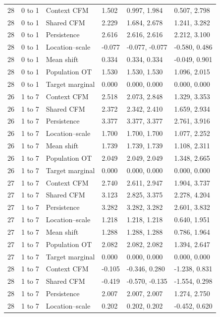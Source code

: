 {\begin{longtable}{@{}p{14mm}p{18mm}p{36mm}p{24mm}p{32mm}p{39mm}@{}}
28 & 0 to 1 & Context CFM & 1.502 & 0.997, 1.984 & 0.507, 2.798\\
28 & 0 to 1 & Shared CFM & 2.229 & 1.684, 2.678 & 1.241, 3.282\\
28 & 0 to 1 & Persistence & 2.616 & 2.616, 2.616 & 2.212, 3.100\\
28 & 0 to 1 & Location--scale & -0.077 & -0.077, -0.077 & -0.580, 0.486\\
28 & 0 to 1 & Mean shift & 0.334 & 0.334, 0.334 & -0.049, 0.901\\
28 & 0 to 1 & Population OT & 1.530 & 1.530, 1.530 & 1.096, 2.015\\
28 & 0 to 1 & Target marginal & 0.000 & 0.000, 0.000 & 0.000, 0.000\\
26 & 1 to 7 & Context CFM & 2.518 & 2.073, 2.848 & 1.329, 3.353\\
26 & 1 to 7 & Shared CFM & 2.372 & 2.342, 2.410 & 1.659, 2.934\\
26 & 1 to 7 & Persistence & 3.377 & 3.377, 3.377 & 2.761, 3.916\\
26 & 1 to 7 & Location--scale & 1.700 & 1.700, 1.700 & 1.077, 2.252\\
26 & 1 to 7 & Mean shift & 1.739 & 1.739, 1.739 & 1.108, 2.311\\
26 & 1 to 7 & Population OT & 2.049 & 2.049, 2.049 & 1.348, 2.665\\
26 & 1 to 7 & Target marginal & 0.000 & 0.000, 0.000 & 0.000, 0.000\\
27 & 1 to 7 & Context CFM & 2.740 & 2.611, 2.947 & 1.904, 3.737\\
27 & 1 to 7 & Shared CFM & 3.123 & 2.825, 3.375 & 2.278, 4.204\\
27 & 1 to 7 & Persistence & 3.282 & 3.282, 3.282 & 2.601, 3.832\\
27 & 1 to 7 & Location--scale & 1.218 & 1.218, 1.218 & 0.640, 1.951\\
27 & 1 to 7 & Mean shift & 1.288 & 1.288, 1.288 & 0.786, 1.964\\
27 & 1 to 7 & Population OT & 2.082 & 2.082, 2.082 & 1.394, 2.647\\
27 & 1 to 7 & Target marginal & 0.000 & 0.000, 0.000 & 0.000, 0.000\\
28 & 1 to 7 & Context CFM & -0.105 & -0.346, 0.280 & -1.238, 0.831\\
28 & 1 to 7 & Shared CFM & -0.419 & -0.570, -0.135 & -1.554, 0.298\\
28 & 1 to 7 & Persistence & 2.007 & 2.007, 2.007 & 1.274, 2.750\\
28 & 1 to 7 & Location--scale & 0.202 & 0.202, 0.202 & -0.452, 0.620\\

\end{longtable}}
